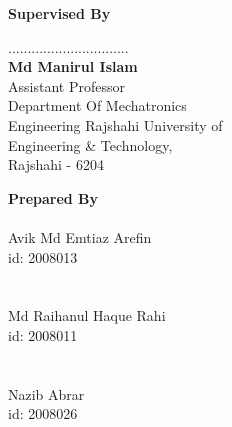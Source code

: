 \singlespacing
\begin{center}
    \begin{multicols}{2}
        \noindent \textbf{Supervised By}


        \noindent ...............................\\
        \textbf{Md Manirul Islam}\\
        Assistant Professor\\
        \noindent Department Of Mechatronics\\
        Engineering
        \noindent Rajshahi University of\\
        Engineering \& Technology,\\
        Rajshahi - 6204

        \columnbreak

        \noindent \textbf{Prepared By}
        \noindent \makebox[6cm]{}\\
        \noindent \makebox[6cm]{\dotfill}\\
        Avik Md Emtiaz Arefin\\
        id: 2008013\\
        \noindent \makebox[6cm]{}\\
        \noindent \makebox[6cm]{\dotfill}\\
        
        Md Raihanul Haque Rahi\\
        id: 2008011\\

        \noindent \makebox[6cm]{}\\
        \noindent \makebox[6cm]{\dotfill}\\
        Nazib Abrar\\
        id: 2008026\\

    \end{multicols}
\end{center}
\doublespacing
